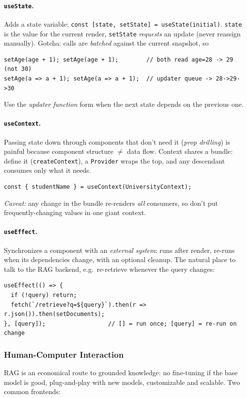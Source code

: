 \documentclass{article}
\begin{document}
\paragraph{\texttt{useState}.} Adds a state variable: \texttt{const [state, setState] = useState(initial)}. \texttt{state} is the value for the current render, \texttt{setState} \textit{requests} an update (never reassign manually). Gotcha: calls are \textit{batched} against the current snapshot, so
\begin{verbatim}
setAge(age + 1); setAge(age + 1);        // both read age=28 -> 29 (not 30)
setAge(a => a + 1); setAge(a => a + 1);  // updater queue -> 28->29->30
\end{verbatim}
Use the \textit{updater function} form when the next state depends on the previous one.

\paragraph{\texttt{useContext}.} Passing state down through components that don't need it (\textit{prop drilling}) is painful because component structure $\neq$ data flow. Context shares a bundle: define it (\texttt{createContext}), a \texttt{Provider} wraps the top, and any descendant consumes only what it needs.
\begin{verbatim}
const { studentName } = useContext(UniversityContext);
\end{verbatim}
\textit{Caveat:} any change in the bundle re-renders \textit{all} consumers, so don't put frequently-changing values in one giant context.

\paragraph{\texttt{useEffect}.} Synchronizes a component with an \textit{external system}: runs after render, re-runs when its dependencies change, with an optional cleanup. The natural place to talk to the RAG backend, e.g.\ re-retrieve whenever the query changes:
\begin{verbatim}
useEffect(() => {
  if (!query) return;
  fetch(`/retrieve?q=${query}`).then(r => r.json()).then(setDocuments);
}, [query]);                  // [] = run once; [query] = re-run on change
\end{verbatim}

\subsubsection{Human-Computer Interaction}
RAG is an economical route to grounded knowledge: no fine-tuning if the base model is good, plug-and-play with new models, customizable and scalable. Two common frontends:
\end{document}
